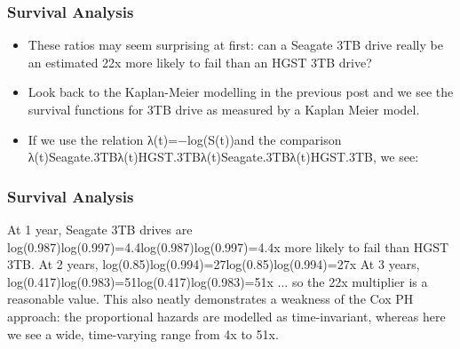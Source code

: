 \documentclass[]{beamer}
\begin{document}
	\begin{frame}
		\frametitle{Survival Analysis}
		\begin{itemize}
			\item These ratios may seem surprising at first: can a Seagate 3TB drive really be an estimated 22x more likely to fail than an HGST 3TB drive? 
			\item Look back to the Kaplan-Meier modelling in the previous post and we see the survival functions for 3TB drive as measured by a Kaplan Meier model. 
			\item If we use the relation λ(t)=−log(S(t))and the comparison λ(t)Seagate.3TBλ(t)HGST.3TBλ(t)Seagate.3TBλ(t)HGST.3TB, we see:
		\end{itemize}	
		
		
	\end{frame}
	\begin{frame}
		\frametitle{Survival Analysis}
		At 1 year, Seagate 3TB drives are log(0.987)log(0.997)=4.4log(0.987)log(0.997)=4.4x more likely to fail than HGST 3TB.
		At 2 years, log(0.85)log(0.994)=27log(0.85)log(0.994)=27x
		At 3 years, log(0.417)log(0.983)=51log(0.417)log(0.983)=51x
		... so the 22x multiplier is a reasonable value. This also neatly demonstrates a weakness of the Cox PH approach: the proportional hazards are modelled as time-invariant, whereas here we see a wide, time-varying range from 4x to 51x.
		
	\end{frame}
\end{document}
